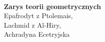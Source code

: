\thispagestyle{empty}

\newpage~\newpage~\newpage~

\thispagestyle{empty}

\begin{center}
    \Huge{\textbf{Zarys teorii geometrycznych}\\}
    \huge{Epafrodyt z Ptolemais,\\
    Lachmid z Al-Hiry,\\
    Achradyna Ecetryjska}
\end{center}

\tableofcontents
\cleardoublepage